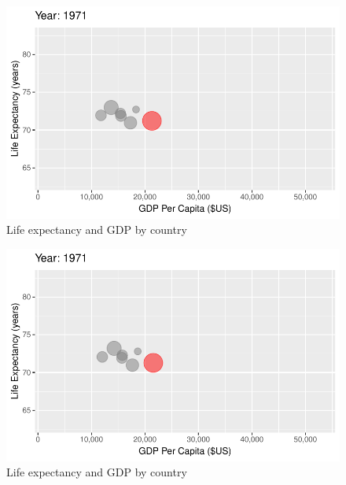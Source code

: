 \documentclass[
  letterpaper,
  DIV=11,
  numbers=noendperiod]{scrreport}
\theoremstyle{definition}
\theoremstyle{remark}
\begin{document}
\begin{figure}

{\centering \includegraphics{index_files/figure-pdf/fig-anim-country-35.pdf}

}

\caption{\label{fig-anim-country-35}Life expectancy and GDP by country}

\end{figure}

\begin{figure}

{\centering \includegraphics{index_files/figure-pdf/fig-anim-country-36.pdf}

}

\caption{\label{fig-anim-country-36}Life expectancy and GDP by country}

\end{figure}
\end{document}

